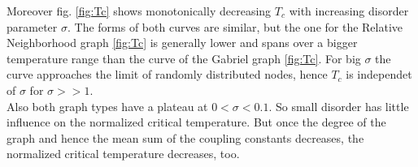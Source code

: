    Moreover fig. \ref{fig:Tc}
    shows monotonically decreasing \(T_c\) with increasing disorder
    parameter \(\sigma\). The forms of both curves are similar, but the
    one for the Relative Neighborhood graph \ref{fig:Tc}
    is generally lower and spans over a bigger temperature range than
    the curve of the Gabriel graph \ref{fig:Tc}.
    For big \(\sigma\) the curve approaches the limit of randomly
    distributed nodes, hence \(T_c\) is independet of \(\sigma\) for
    \(\sigma >> 1\).\\
    Also both graph types have a plateau at \(0 < \sigma < 0.1\). So
    small disorder has little influence on the normalized critical temperature.
    But once the degree of the graph and hence the mean sum of the coupling
    constants decreases, the normalized critical temperature decreases, too.

